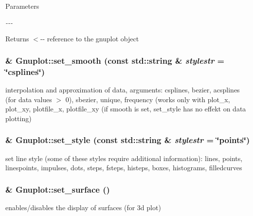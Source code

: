 \begin{DoxyParams}{Parameters}
\item[{\em -\/-\/-\/}]\end{DoxyParams}
\begin{DoxyReturn}{Returns}
$<$-\/-\/ reference to the gnuplot object 
\end{DoxyReturn}
\hypertarget{class_gnuplot_aa18386919da2ec4c994f1f9c7195d384}{
\subsubsection[{set\_\-smooth}]{ \& Gnuplot::set\_\-smooth (const std::string \& {\em stylestr} = {\ttfamily \char`\"{}csplines\char`\"{}})}}
\label{class_gnuplot_aa18386919da2ec4c994f1f9c7195d384}
interpolation and approximation of data, arguments: csplines, bezier, acsplines (for data values $>$ 0), sbezier, unique, frequency (works only with plot\_\-x, plot\_\-xy, plotfile\_\-x, plotfile\_\-xy (if smooth is set, set\_\-style has no effekt on data plotting) \hypertarget{class_gnuplot_acfdcda292650775ebed4683e8e1515b5}{
\subsubsection[{set\_\-style}]{ \& Gnuplot::set\_\-style (const std::string \& {\em stylestr} = {\ttfamily \char`\"{}points\char`\"{}})}}
\label{class_gnuplot_acfdcda292650775ebed4683e8e1515b5}
set line style (some of these styles require additional information): lines, points, linespoints, impulses, dots, steps, fsteps, histeps, boxes, histograms, filledcurves \hypertarget{class_gnuplot_a9825bd26500e30ca88404c4807e6607a}{
\subsubsection[{set\_\-surface}]{\& Gnuplot::set\_\-surface ()}}
\label{class_gnuplot_a9825bd26500e30ca88404c4807e6607a}
enables/disables the display of surfaces (for 3d plot)


